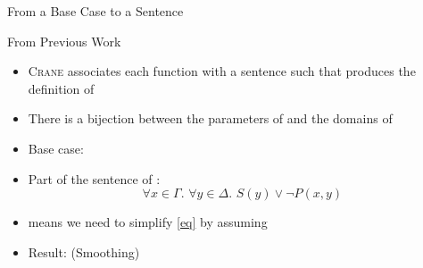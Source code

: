 \documentclass{beamer}
\begin{document}
\begin{frame}[fragile]{From a Base Case to a Sentence}
  \begin{block}{From Previous Work~}
    \begin{itemize}
      \item \textsc{Crane} associates each function  with a
            sentence \structure{$\phi$} such that
             produces the definition of
      \item There is a bijection between the parameters of  and
            the domains of \structure{$\phi$}
    \end{itemize}
  \end{block}
  \begin{example}
    \begin{itemize}
      \item Base case: 
      \item<3-> \alert{Part} of the sentence of :
            \begin{equation}\label{eq}
              \forall x \in \Gamma\text{. }\forall y \in \Delta\text{. }S(y) \lor \neg P(x, y)
            \end{equation}
      \item<4->  means we need to simplify \eqref{eq}
            by assuming 
      \item<5-> Result:  \qquad (\alert{Smoothing})
    \end{itemize}
  \end{example}
\end{frame}
\end{document}
